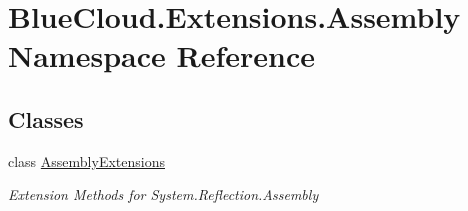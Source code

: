 \hypertarget{namespace_blue_cloud_1_1_extensions_1_1_assembly}{}\section{Blue\+Cloud.\+Extensions.\+Assembly Namespace Reference}
\label{namespace_blue_cloud_1_1_extensions_1_1_assembly}
\subsection*{Classes}
\begin{DoxyCompactItemize}
\item 
class \mbox{\hyperlink{class_blue_cloud_1_1_extensions_1_1_assembly_1_1_assembly_extensions}{Assembly\+Extensions}}
\begin{DoxyCompactList}\small\item\em Extension Methods for System.\+Reflection.\+Assembly \end{DoxyCompactList}\end{DoxyCompactItemize}

